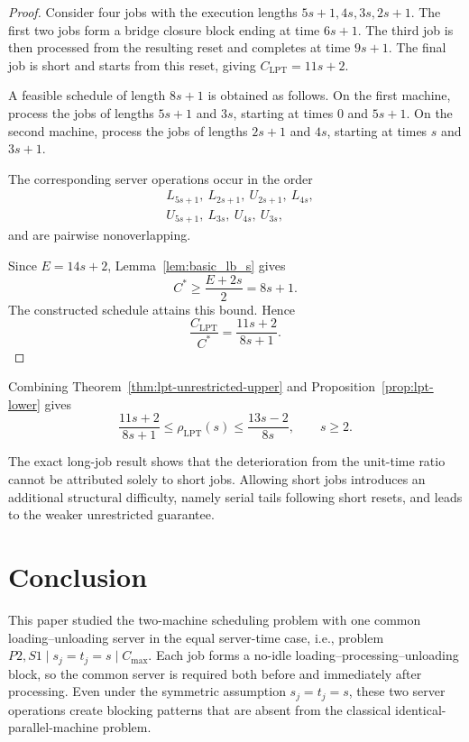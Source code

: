 \documentclass[11pt]{article}
\begin{document}
\begin{proof}
Consider four jobs with the execution lengths \(5s+1,4s,3s,2s+1\).
The first two jobs form a bridge closure block ending at time \(6s+1\). The
third job is then processed from the resulting reset and completes at time
\(9s+1\). The final job is short and starts from this reset, giving \(C_{\mathrm{LPT}}=11s+2\).

A feasible schedule of length \(8s+1\) is obtained as follows. On the first
machine, process the jobs of lengths \(5s+1\) and \(3s\), starting at times
\(0\) and \(5s+1\). On the second machine, process the jobs of lengths
\(2s+1\) and \(4s\), starting at times \(s\) and \(3s+1\).

The corresponding server operations occur in the order
\[
\begin{aligned}
&L_{5s+1},\ L_{2s+1},\ U_{2s+1},\ L_{4s},\\
&U_{5s+1},\ L_{3s},\ U_{4s},\ U_{3s},
\end{aligned}
\]
and are pairwise nonoverlapping.

Since \(E=14s+2\), Lemma~\ref{lem:basic_lb_s} gives
\[
C^*\ge\frac{E+2s}{2}=8s+1.
\]
The constructed schedule attains this bound. Hence
\[
\frac{C_{\mathrm{LPT}}}{C^*}
=
\frac{11s+2}{8s+1}.
\]
\end{proof}

Combining Theorem~\ref{thm:lpt-unrestricted-upper} and
Proposition~\ref{prop:lpt-lower} gives
\[
\boxed{
\frac{11s+2}{8s+1}
\le
\rho_{\mathrm{LPT}}(s)
\le
\frac{13s-2}{8s},
\qquad s\ge2.
}
\]

The exact long-job result shows that the deterioration from the unit-time ratio
cannot be attributed solely to short jobs. Allowing short jobs introduces an
additional structural difficulty, namely serial tails following short resets,
and leads to the weaker unrestricted guarantee.

\section{Conclusion}
\label{sec:conclusion}

This paper studied the two-machine scheduling problem with one common
loading--unloading server in the equal server-time case, i.e., problem 
\(P2,S1\mid s_j=t_j=s\mid C_{\max}\). Each job forms a no-idle
loading--processing--unloading block, so the common server is required both before
and immediately after processing. Even under the symmetric assumption
\(s_j=t_j=s\), these two server operations create blocking patterns that are absent
from the classical identical-parallel-machine problem.
\end{document}
